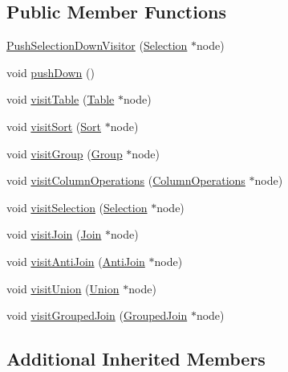\subsection*{Public Member Functions}
\begin{DoxyCompactItemize}
\item 
\hyperlink{class_push_selection_down_visitor_a1be0a28ee1650a54e5c23af1d8effc54}{Push\+Selection\+Down\+Visitor} (\hyperlink{class_selection}{Selection} $\ast$node)
\item 
void \hyperlink{class_push_selection_down_visitor_a343e4e8b9742602455232d5877bf2e15}{push\+Down} ()
\item 
void \hyperlink{class_push_selection_down_visitor_af848a068e14d7c1227fc19411607c463}{visit\+Table} (\hyperlink{class_table}{Table} $\ast$node)
\item 
void \hyperlink{class_push_selection_down_visitor_a15fb2f0fb19d10c40405c4683fd2a2d8}{visit\+Sort} (\hyperlink{class_sort}{Sort} $\ast$node)
\item 
void \hyperlink{class_push_selection_down_visitor_a551561414b97bce56c1bba3829ff9769}{visit\+Group} (\hyperlink{class_group}{Group} $\ast$node)
\item 
void \hyperlink{class_push_selection_down_visitor_a09ade5d0a2d194fee1b5b555d36104a4}{visit\+Column\+Operations} (\hyperlink{class_column_operations}{Column\+Operations} $\ast$node)
\item 
void \hyperlink{class_push_selection_down_visitor_a2534debe115bf3f6648281cc6d0d10ac}{visit\+Selection} (\hyperlink{class_selection}{Selection} $\ast$node)
\item 
void \hyperlink{class_push_selection_down_visitor_a25ff28bccfd9c35119d06117e63465be}{visit\+Join} (\hyperlink{class_join}{Join} $\ast$node)
\item 
void \hyperlink{class_push_selection_down_visitor_a85d6088ea2c478aa85cf62603f30d83a}{visit\+Anti\+Join} (\hyperlink{class_anti_join}{Anti\+Join} $\ast$node)
\item 
void \hyperlink{class_push_selection_down_visitor_a82783e1b22e71264102b53f39d057897}{visit\+Union} (\hyperlink{class_union}{Union} $\ast$node)
\item 
void \hyperlink{class_push_selection_down_visitor_aadf48938c2e165db563095720e10eca6}{visit\+Grouped\+Join} (\hyperlink{class_grouped_join}{Grouped\+Join} $\ast$node)
\end{DoxyCompactItemize}
\subsection*{Additional Inherited Members}


